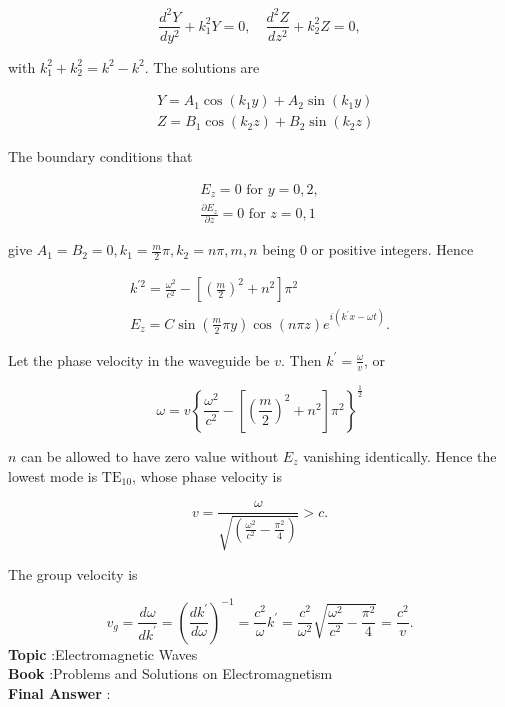 \documentclass[10pt]{article}
\begin{document}
$$
\frac{d^{2} Y}{d y^{2}}+k_{1}^{2} Y=0, \quad \frac{d^{2} Z}{d z^{2}}+k_{2}^{2} Z=0,
$$

with $k_{1}^{2}+k_{2}^{2}=k^{2}-k^{2}$. The solutions are

$$
\begin{aligned}
&Y=A_{1} \cos \left(k_{1} y\right)+A_{2} \sin \left(k_{1} y\right) \\
&Z=B_{1} \cos \left(k_{2} z\right)+B_{2} \sin \left(k_{2} z\right)
\end{aligned}
$$

The boundary conditions that

$$
\begin{gathered}
E_{z}=0 \text { for } y=0,2, \\
\frac{\partial E_{z}}{\partial z}=0 \text { for } z=0,1
\end{gathered}
$$

give $A_{1}=B_{2}=0, k_{1}=\frac{m}{2} \pi, k_{2}=n \pi, m, n$ being 0 or positive integers. Hence

$$
\begin{gathered}
k^{\prime 2}=\frac{\omega^{2}}{c^{2}}-\left[\left(\frac{m}{2}\right)^{2}+n^{2}\right] \pi^{2} \\
E_{z}=C \sin \left(\frac{m}{2} \pi y\right) \cos (n \pi z) e^{i\left(k^{\prime} x-\omega t\right)} .
\end{gathered}
$$

Let the phase velocity in the waveguide be $v$. Then $k^{\prime}=\frac{\omega}{v}$, or

$$
\omega=v\left\{\frac{\omega^{2}}{c^{2}}-\left[\left(\frac{m}{2}\right)^{2}+n^{2}\right] \pi^{2}\right\}^{\frac{1}{2}}
$$

$n$ can be allowed to have zero value without $E_{z}$ vanishing identically. Hence the lowest mode is $\mathrm{TE}_{10}$, whose phase velocity is

$$
v=\frac{\omega}{\sqrt{\left(\frac{\omega^{2}}{c^{2}}-\frac{\pi^{2}}{4}\right)}}>c .
$$

The group velocity is

$$
v_{g}=\frac{d \omega}{d k^{\prime}}=\left(\frac{d k^{\prime}}{d \omega}\right)^{-1}=\frac{c^{2}}{\omega} k^{\prime}=\frac{c^{2}}{\omega^{2}} \sqrt{\frac{\omega^{2}}{c^{2}}-\frac{\pi^{2}}{4}}=\frac{c^{2}}{v} .
$$
\textbf{Topic} :Electromagnetic Waves\\
\textbf{Book} :Problems and Solutions on Electromagnetism\\
\textbf{Final Answer} :\\
\end{document}
